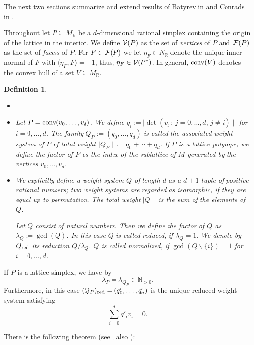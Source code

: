 \documentclass[a4paper,twoside]{article}
\newcommand{\card}[1]{{\mid\! #1 \!\mid}}
\newcommand{\pro}[2]{\langle #1, #2 \rangle}
\def\N{{\mathbb N}}
\def\R{{\mathbb R}}
\def\Qred{{Q_{\rm red}}}
\def\red{{\rm red}}
\def\F{{\cal F}}
\def\V{{{\cal V}}}
\def\conv{{\rm conv}}
\def\NR{{N_{\R}}}
\def\MR{{M_{\R}}}
\newtheorem{definition}[theorem]{Definition}
\begin{document}
The next two sections summarize and extend results of Batyrev in \cite[5.4,5.5]{Bat94} and Conrads in \cite{Con02}. 

\smallskip

Throughout let $P \subseteq \MR$ be a $d$-dimensional rational simplex containing the origin of the lattice 
in the interior. We define $\V(P)$ as the set of {\em vertices} of $P$ and 
$\F(P)$ as the set of {\em facets} of $P$. For $F \in \F(P)$ we let $\eta_F \in \NR$ denote 
the unique inner normal of $F$ with $\pro{\eta_F}{F} = -1$, thus, $\eta_F \in \V(P^*)$. 
In general, $\conv(V)$ denotes the convex hull of a set $V \subseteq \MR$. 

\begin{definition}{\rm 
\begin{itemize}
\item[]
\item Let $P = \conv(v_0, \ldots, v_d)$. 
We define $q_i := \card{\det(v_j \,:\, j=0, \ldots, d, \, j \not=i)}$ for $i = 0, \ldots, d$. 
The family $Q_P := (q_0, \ldots, q_d)$ is called the associated 
{\em weight system} of $P$ of {\em total weight} $\card{Q_P} := q_0 + \cdots + q_d$. 
If $P$ is a lattice polytope, we define the {\em factor} of $P$ as the index of the sublattice of $M$ generated by 
the vertices $v_0, \ldots, v_d$. 
\item We explicitly define a {\em weight system} $Q$ {\em of length} $d$ as a $d+1$-tuple of positive 
rational numbers; two weight systems are regarded as {\em isomorphic}, if they are equal up to permutation. 
The {\em total weight} $\card{Q}$ is the sum of the elements of $Q$. 

Let $Q$ consist of natural numbers. 
Then we define the {\em factor} of $Q$ as $\lambda_Q := \gcd(Q)$. 
In this case $Q$ is called {\em reduced}, if $\lambda_Q = 1$. 
We denote by $\Qred$ its {\em reduction} $Q/\lambda_Q$. $Q$ is called {\em normalized}, if 
$\gcd(Q\backslash\{i\}) = 1$ for $i = 0, \ldots, d$.
\end{itemize}
}
\end{definition}

If $P$ is a lattice simplex, we have by \cite[Lemma 2.4]{Con02}
\[\lambda_P = \lambda_{Q_P} \in \N_{> 0}.\]
Furthermore, in this case $(Q_P)_\red = (q'_0, \ldots, q'_n)$ is the unique reduced weight system satisfying 
\begin{equation}
\sum_{i=0}^d q'_i v_i = 0.
\label{charrel}
\end{equation}

There is the following theorem (see \cite[4.4-7]{Con02}, also \cite[Thm. 5.4.5]{Bat94}):
\end{document}
